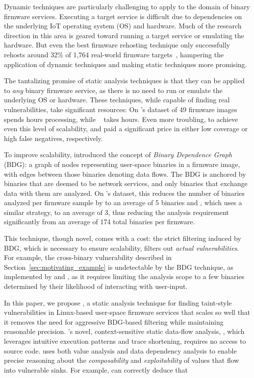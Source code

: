 Dynamic techniques are particularly challenging to apply to the domain of binary firmware services.
Executing a target service is difficult due to dependencies on the underlying IoT operating system (OS) and hardware.
Much of the research direction in this area is geared toward running a target service or emulating the hardware.
But even the best firmware rehosting technique only successfully rehosts around 32\% of 1,764 real-world firmware targets~\cite{greenhouse}, hampering the application of dynamic techniques and making static techniques more promising.

The tantalizing promise of static analysis techniques is that they can be applied to \emph{any} binary firmware service, as there is no need to run or emulate the underlying OS or hardware.
These techniques, while capable of finding real vulnerabilities, take significant resources:
On \karonte's dataset of 49 firmware images \satc~\cite{SaTC} spends \SaTConKaronteHours hours processing, while \karonte~\cite{karonte} takes \KaronteonKaronteHours hours.
Even more troubling, to achieve even this level of scalability, \karonte and \satc paid a significant price in either low coverage or high false negatives, respectively.

To improve scalability, \karonte introduced the concept of \emph{Binary Dependence Graph} (BDG): a graph of nodes representing user-space binaries in a firmware image, with edges between those binaries denoting data flows.
The BDG is anchored by binaries that are deemed to be network services, and only binaries that exchange data with them are analyzed.
On \karonte's dataset, this reduces the number of binaries analyzed per firmware sample by \karonte to an average of 5 binaries and \satc, which uses a similar strategy, to an average of 3, thus reducing the analysis requirement significantly from an average of 174 total binaries per firmware.

This technique, though novel, comes with a cost: the strict filtering induced by BDG, which is necessary to ensure scalability, filters out \emph{actual vulnerabilities}.
For example, the cross-binary vulnerability described in Section~\ref{sec:motivating_example} is undetectable by the BDG technique, as implemented by \karonte and \satc, as it requires limiting the analysis scope to a few binaries determined by their likelihood of interacting with user-input.

\smallskip

In this paper, we propose \mango, a static analysis technique for finding taint-style vulnerabilities in Linux-based user-space firmware services that scales so well that it removes the need for aggressive BDG-based filtering while maintaining reasonable precision.
\mango's novel, context-sensitive static data-flow analysis, \rda, which leverages intuitive execution patterns and trace shortening, requires no access to source code.
\rda uses both value analysis and data dependency analysis to enable precise reasoning about the \emph{composability} and \emph{exploitability} of values that flow into vulnerable sinks.
For example, \rda can correctly deduce that

